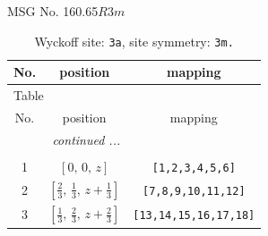 \documentclass[fleqn,8pt]{jsarticle}
\begin{document}
\setcounter{MaxMatrixCols}{32}

\renewcommand{\tablename}{Table~}
\renewcommand{\figurename}{Figure~}
\begin{center}
\LARGE
MSG No. 160.65\quad$R3m$
\end{center}
\renewcommand{\arraystretch}{1.2}
\begin{longtable}{ccc}
\caption{Wyckoff site: {\tt 3a}, site symmetry: {\tt 3m.}}
 \\
 \hline \hline
No. & position & mapping \\ \hline \endfirsthead

\multicolumn{2}{l}{\tablename\ \thetable{}} \\
 \hline \hline
No. & position & mapping \\ \hline \endhead

 \hline \hline
\multicolumn{2}{r}{\footnotesize\it continued ...} \\ \endfoot

 \hline \hline
\multicolumn{2}{r}{} \\ \endlastfoot

1 & $\left[ 0,\, 0,\, z \right]$ & {\tt [1,2,3,4,5,6]} \\ \hline
2 & $\left[ \frac{2}{3},\, \frac{1}{3},\, z + \frac{1}{3} \right]$ & {\tt [7,8,9,10,11,12]} \\ \hline
3 & $\left[ \frac{1}{3},\, \frac{2}{3},\, z + \frac{2}{3} \right]$ & {\tt [13,14,15,16,17,18]} \\
\end{longtable}
\renewcommand{\arraystretch}{1.2}
\end{document}
